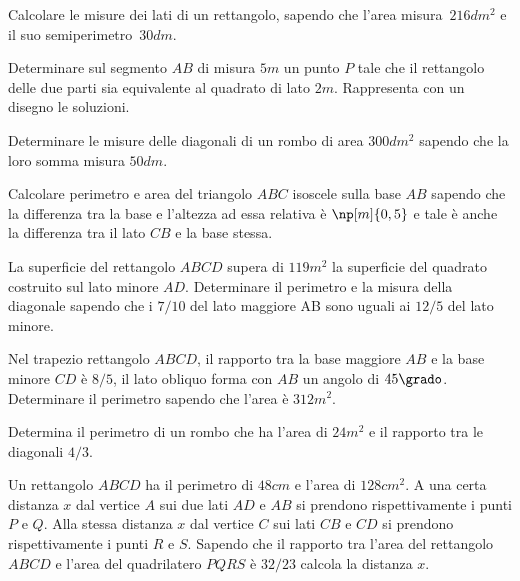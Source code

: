 \begin{multicols}{2}
\begin{esercizio}[\Ast] %
 \label{ese:3.152}
Calcolare le misure dei lati di un rettangolo, sapendo che l'area misura~$216\unit{dm^2}$ e il suo semiperimetro~$30\unit{dm}$.
\end{esercizio}

\begin{esercizio}[\Ast]
 \label{ese:3.153}
Determinare sul segmento $ AB $ di misura $ 5\unit{m} $ un punto $ P $ tale che il rettangolo
delle due parti sia equivalente al quadrato di lato $ 2\unit{m} $. Rappresenta con un
disegno le soluzioni.
\end{esercizio}

\begin{esercizio}[\Ast] %
 \label{ese:3.154}
Determinare le misure delle diagonali di un rombo di area $300\unit{dm^2}$ sapendo che la loro somma misura $50\unit{dm}$.
\end{esercizio}

\begin{esercizio}[\Ast]
 \label{ese:3.155}
Calcolare perimetro e area del triangolo $ ABC $ isoscele sulla base $ AB $ sapendo
che la differenza tra la base e l'altezza ad essa relativa è $\np[m]{0,5}$ e tale
è anche la differenza tra il lato $ CB $ e la base stessa.
\end{esercizio}

\begin{esercizio}[\Ast]
 \label{ese:3.156}
La superficie del rettangolo $ ABCD $ supera di $ 119\unit{m^2} $ la superficie del quadrato
costruito sul lato minore $ AD $. Determinare il perimetro e la misura della
diagonale sapendo che i $ 7/10 $ del lato maggiore AB sono uguali ai $ 12/5 $ del
lato minore.
\end{esercizio}

\begin{esercizio}[\Ast]
 \label{ese:3.157}
Nel trapezio rettangolo $ ABCD $, il rapporto tra la base maggiore $ AB $ e la base
minore $ CD $ è $ 8/5 $, il lato obliquo forma con $ AB $ un angolo di $ 45\grado $. Determinare
il perimetro sapendo che l'area è $312\unit{m^2}$.
\end{esercizio}

\begin{esercizio}[\Ast]
 \label{ese:3.158}
Determina il perimetro di un rombo che ha l'area di $24\unit{m^2}$ e il rapporto tra
le diagonali $ 4/3 $.
\end{esercizio}

\begin{esercizio}[\Ast]
 \label{ese:3.159}
Un rettangolo $ ABCD $ ha il perimetro di $ 48\unit{cm} $ e l'area di $ 128\unit{cm^2} $. A una certa
distanza $x$ dal vertice $ A $ sui due lati $ AD $ e $ AB $ si prendono rispettivamente i
punti $ P $ e $ Q $. Alla stessa distanza $ x $ dal vertice $ C $ sui lati $ CB $ e $ CD $ si
prendono rispettivamente i punti $ R $ e $ S $. Sapendo che il rapporto tra l'area
del rettangolo $ ABCD $ e l'area del quadrilatero $ PQRS $ è $ 32/23 $ calcola la
distanza $x$.
\end{esercizio}


\end{multicols}
